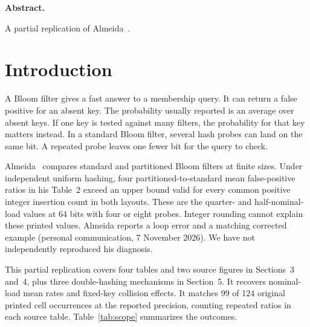{\small\sffamily \textbf{Abstract.} \articleABSTRACT\par}
\smallskip
{\small\sffamily A partial replication of Almeida~\cite{almeida2023}.\par}

\section{Introduction}

A Bloom filter gives a fast answer to a membership query. It can return a
false positive for an absent key. The probability usually reported is an
average over absent keys. If one key is tested against many filters, the
probability for that key matters instead. In a standard Bloom filter,
several hash probes can land on the same bit. A repeated probe
leaves one fewer bit for the query to check.

Almeida~\cite{almeida2023} compares standard and partitioned Bloom filters at finite sizes.
Under independent uniform hashing, four partitioned-to-standard mean
false-positive ratios in his Table~2 exceed an upper bound valid for every
common positive integer insertion count in both layouts. These are the
quarter- and half-nominal-load values at 64 bits with four or eight probes.
Integer rounding cannot explain these printed values. Almeida reports a loop
error and a matching corrected example (personal communication, 7 November
2026). We have not independently reproduced his diagnosis.

This partial replication covers four tables and two source figures in Sections~3
and~4, plus three double-hashing mechanisms in Section~5. It recovers
nominal-load mean rates and fixed-key collision effects. It matches 99
of 124 original printed cell occurrences at the reported precision,
counting repeated ratios in each source table.
Table~\ref{tab:scope} summarizes the outcomes.

